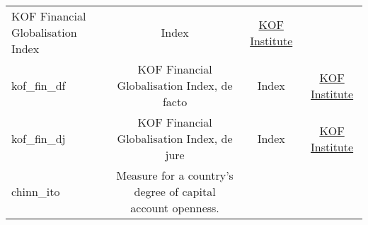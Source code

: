 \documentclass[]{article}
\begin{document}
\begin{longtable}[]{@{}lccc@{}}
\begin{minipage}[t]{0.36\columnwidth}
KOF Financial Globalisation Index\strut
\end{minipage} & \begin{minipage}[t]{0.24\columnwidth}\centering\strut
Index\strut
\end{minipage} & \begin{minipage}[t]{0.15\columnwidth}\centering\strut
\href{https://www.kof.ethz.ch/en/forecasts-and-indicators/indicators/kof-globalisation-index.html}{KOF
Institute}\strut
\end{minipage}\tabularnewline
\begin{minipage}[t]{0.14\columnwidth}\raggedright\strut
kof\_fin\_df\strut
\end{minipage} & \begin{minipage}[t]{0.36\columnwidth}\centering\strut
KOF Financial Globalisation Index, de facto\strut
\end{minipage} & \begin{minipage}[t]{0.24\columnwidth}\centering\strut
Index\strut
\end{minipage} & \begin{minipage}[t]{0.15\columnwidth}\centering\strut
\href{https://www.kof.ethz.ch/en/forecasts-and-indicators/indicators/kof-globalisation-index.html}{KOF
Institute}\strut
\end{minipage}\tabularnewline
\begin{minipage}[t]{0.14\columnwidth}\raggedright\strut
kof\_fin\_dj\strut
\end{minipage} & \begin{minipage}[t]{0.36\columnwidth}\centering\strut
KOF Financial Globalisation Index, de jure\strut
\end{minipage} & \begin{minipage}[t]{0.24\columnwidth}\centering\strut
Index\strut
\end{minipage} & \begin{minipage}[t]{0.15\columnwidth}\centering\strut
\href{https://www.kof.ethz.ch/en/forecasts-and-indicators/indicators/kof-globalisation-index.html}{KOF
Institute}\strut
\end{minipage}\tabularnewline
\begin{minipage}[t]{0.14\columnwidth}\raggedright\strut
chinn\_ito\strut
\end{minipage} & \begin{minipage}[t]{0.36\columnwidth}\centering\strut
Measure for a country's degree of capital account openness.\strut
\end{minipage} & \begin{minipage}[t]{0.24\columnwidth}\centering\strut

\end{minipage}
\end{longtable}
\end{document}
